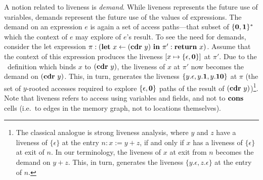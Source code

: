 \documentclass[9pt]{sigplanconf}
\begin{document}
A  notion  related  to  liveness  is  {\em  demand}.   While  liveness
represents the  future use of variables, demands  represent the future
use of the  values of expressions. The demand on  an expression $e$ is
again a  set of  access paths---that subset  of $\{\mathbf{0},\mathbf{1}\}^\ast$
which the context of $e$ may explore of $e$'s result.  To see the need
for  demands,  consider   the  let  expression  $\pi:(\mbox{$\mathbf{ let}$}~x\leftarrow
(\mbox{$\mathbf{cdr}$}~y)~\mbox{$\mathbf{ in}$}~  \pi':\mbox{$\mathbf{ return}$}~x)$.  Assume  that  the  context  of  this
expression produces  the liveness $[x \mapsto  \lbrace \epsilon, \mathbf{0}
  \rbrace]$ at $\pi'$.  Due to the \LET\ definition which binds $x$ to
$(\mbox{$\mathbf{cdr}$}~y)$, the  liveness of $x$ at  $\pi'$ now becomes  the demand on
$(\mbox{$\mathbf{cdr}$}~y)$.    This,  in   turn,  generates   the   liveness  $\lbrace
y.\epsilon,  y.\mathbf{1},  y.\mathbf{1}\mathbf{0}  \rbrace$  at $\pi$  (the  set  of
$y$-rooted  accesses  required  to  explore $\lbrace  \epsilon,  \mathbf{0}
\rbrace$  paths of  the result  of  $(\mbox{$\mathbf{cdr}$}~y)$)\footnote{The classical
  analogue  is strong  liveness analysis,  where  $y$ and  $z$ have  a
  liveness of  $\lbrace\epsilon\rbrace$ at  the entry $n:  x:=y+z$, if
  and only if  $x$ has a liveness of  $\lbrace\epsilon\rbrace$ at exit
  of $n$.   In our terminology, the  liveness of $x$ at  exit from $n$
  becomes the  demand on $y+z$.  This, in turn,  generates the  liveness $\lbrace
  y.\epsilon, z.\epsilon \rbrace$ at the entry of $n$.}.
Note that  liveness refers to  access using variables and  fields, and
not  to $\mbox{$\mathbf{cons}$}$  cells (i.e.\  to edges  in the  memory graph,  not to
locations themselves).
\end{document}
